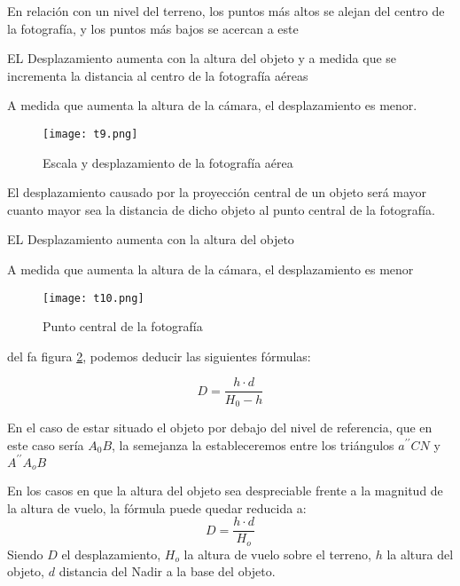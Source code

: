 \begin{definition}[Desplazamiento]
  En relación con un nivel del terreno, los puntos más altos se alejan del centro de la fotografía, y los puntos más bajos se acercan a este
\end{definition}

EL Desplazamiento aumenta con la altura del objeto y a medida que se incrementa la distancia al centro de la fotografía aéreas 

A medida que aumenta la altura de la cámara, el desplazamiento es menor.                                                                                                               

\begin{figure}[h!]
  \centerline{\texttt{[image: t9.png]}}
  \caption{Escala y desplazamiento de la fotografía aérea}
  \label{t9}
\end{figure}

El desplazamiento causado por la proyección central de un objeto será mayor cuanto mayor sea la distancia de dicho objeto al punto central de la fotografía. 

EL Desplazamiento aumenta con la altura del objeto

A medida que aumenta la altura de la cámara, el desplazamiento es menor

\begin{figure}[h!]
  \centerline{\texttt{[image: t10.png]}}
  \caption{Punto central de la fotografía}
  \label{t10}
\end{figure}

del fa figura \ref{t10}, podemos deducir las siguientes fórmulas:

\begin{equation}
  D=\frac{h\cdot d}{H_0-h}
\end{equation}

En el caso de estar situado el objeto por debajo del nivel de referencia, que en este caso sería $A_0B$, la semejanza la estableceremos entre los triángulos $a^{\prime\prime}CN$ y $A^{\prime\prime} A_oB$

En los casos en que la altura del objeto sea despreciable frente a la magnitud de la altura de vuelo, la fórmula puede quedar reducida a: 
\begin{equation}
  D=\frac{h\cdot d}{H_o}
\end{equation}
Siendo $D$ el desplazamiento, $H_o$ la altura de vuelo sobre el terreno, $h$ la altura del objeto, $d$ distancia del Nadir a la base del objeto.

